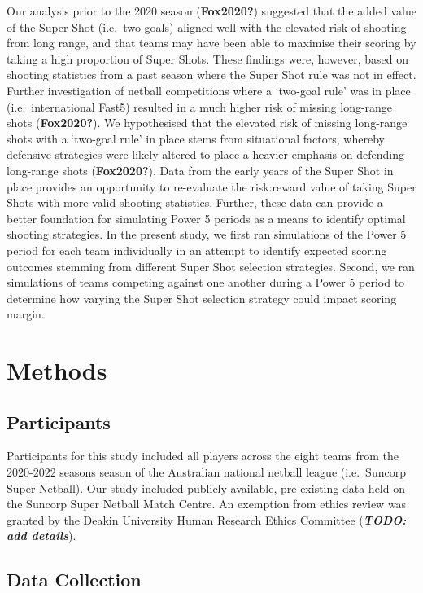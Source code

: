 \documentclass[]{elsarticle} %
\begin{document}
Our analysis prior to the 2020 season (\textbf{Fox2020?}) suggested that
the added value of the Super Shot (i.e.~two-goals) aligned well with the
elevated risk of shooting from long range, and that teams may have been
able to maximise their scoring by taking a high proportion of Super
Shots. These findings were, however, based on shooting statistics from a
past season where the Super Shot rule was not in effect. Further
investigation of netball competitions where a `two-goal rule' was in
place (i.e.~international Fast5) resulted in a much higher risk of
missing long-range shots (\textbf{Fox2020?}). We hypothesised that the
elevated risk of missing long-range shots with a `two-goal rule' in
place stems from situational factors, whereby defensive strategies were
likely altered to place a heavier emphasis on defending long-range shots
(\textbf{Fox2020?}). Data from the early years of the Super Shot in
place provides an opportunity to re-evaluate the risk:reward value of
taking Super Shots with more valid shooting statistics. Further, these
data can provide a better foundation for simulating Power 5 periods as a
means to identify optimal shooting strategies. In the present study, we
first ran simulations of the Power 5 period for each team individually
in an attempt to identify expected scoring outcomes stemming from
different Super Shot selection strategies. Second, we ran simulations of
teams competing against one another during a Power 5 period to determine
how varying the Super Shot selection strategy could impact scoring
margin.

\hypertarget{methods}{%
\section{Methods}\label{methods}}

\hypertarget{participants}{%
\subsection{Participants}\label{participants}}

Participants for this study included all players across the eight teams
from the 2020-2022 seasons season of the Australian national netball
league (i.e.~Suncorp Super Netball). Our study included publicly
available, pre-existing data held on the Suncorp Super Netball Match
Centre. An exemption from ethics review was granted by the Deakin
University Human Research Ethics Committee (\textbf{\emph{TODO: add
details}}).

\hypertarget{data-collection}{%
\subsection{Data Collection}\label{data-collection}}
\end{document}
